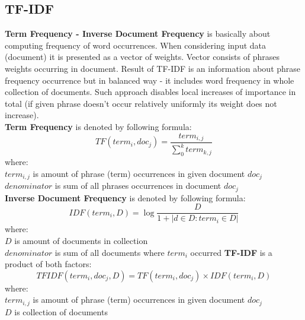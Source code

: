 \subsection{TF-IDF}
\textbf{Term Frequency - Inverse Document Frequency} is basically about computing frequency of word occurrences. When considering input data (document) it is presented as a vector of weights. Vector consists of phrases weights occurring in document. Result of TF-IDF is an information about phrase frequency occurrence but in balanced way - it includes word frequency in whole collection of documents. Such approach disables local increases of importance in total (if given phrase doesn't occur relatively uniformly its weight does not increase).\\ \textbf{Term Frequency} is denoted by following formula:
\begin{equation} 
TF(term_i,doc_j)=\frac{term_{i,j}}{\sum_{0}^{k}term_{k,j}}
\end{equation}
where:\\
$term_{i,j}$ is amount of phrase (term) occurrences in given document $doc_j$\\ 
$denominator$ is sum of all phrases occurrences in document $doc_j$
\\\newline\textbf{Inverse Document Frequency} is denoted by following formula:
\begin{equation}
IDF(term_i, D) =\log{\frac{D}{1+{|d\in D : term_i \in D|}}}
\end{equation}
where:\\
$D$ is amount of documents in collection\\ 
$denominator$ is sum of all documents where $term_i$ occurred
\newline\textbf{TF-IDF} is a product of both factors:
\begin{equation}
TFIDF(term_i, doc_j, D) = TF(term_i,doc_j)\times IDF(term_i,D)
\end{equation}
where:\\
$term_{i,j}$ is amount of phrase (term) occurrences in given document $doc_j$\\
$D$ is collection of documents

